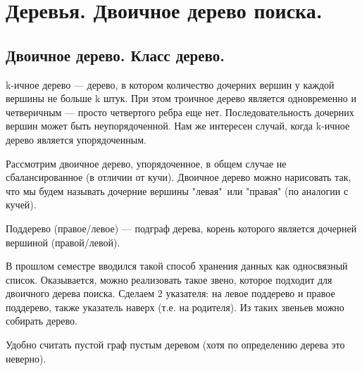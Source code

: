 \chapter{Деревья. Двоичное дерево поиска.}
\section{Двоичное дерево. Класс  дерево.}
\textsf{k-ичное дерево} --- дерево, в котором количество дочерних вершин у каждой вершины не больше k штук. При этом троичное дерево является одновременно и четверичным --- просто четвертого ребра еще нет. Последовательность дочерних вершин может быть неупорядоченной. Нам же интересен случай, когда k-ичное дерево является упорядоченным. 

Рассмотрим двоичное дерево, упорядоченное, в общем случае не сбалансированное (в отличии от кучи). Двоичное дерево можно нарисовать так, что мы будем называть дочерние вершины "левая"\ или "правая" (по аналогии с кучей). 

\textsf{Поддерево} (правое/левое) --- подграф дерева, корень которого является дочерней вершиной (правой/левой). 

В прошлом семестре вводился такой способ хранения данных как односвязный список. Оказывается, можно реализовать такое звено, которое подходит для двоичного дерева поиска. Сделаем 2 указателя: на левое поддерево и правое поддерево, также указатель наверх (т.е. на родителя). Из таких звеньев можно собирать дерево.

Удобно считать пустой граф пустым деревом (хотя по определению дерева это неверно).


